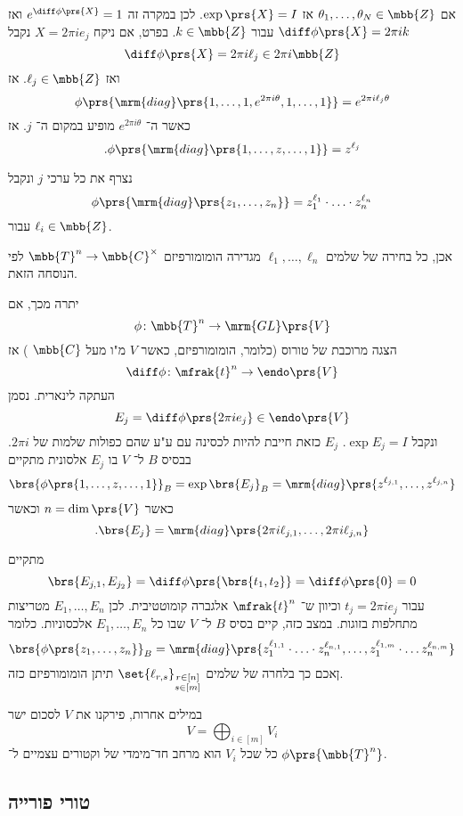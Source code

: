 \documentclass[10pt, twoside]{book}
\begin{document}
אם
$\theta_1,\ldots, \theta_N \in \mbb{Z}$
אז
$\exp\prs{X} = I$.
לכן במקרה זה
$e^{\diff \phi\prs{X}} = 1$
ואז
$\diff \phi\prs{X} = 2 \pi i k$
עבור
$k \in \mbb{Z}$.
בפרט, אם ניקח
$X = 2 \pi i e_j$
נקבל
\[\diff \phi\prs{X} = 2 \pi i \ell_j \in 2 \pi i \mbb{Z}\]
ואז
$\ell_j \in \mbb{Z}$.
אז
\[\phi\prs{\mrm{diag}\prs{1, \ldots, 1, e^{2 \pi i \theta}, 1, \ldots, 1}} = e^{2 \pi i \ell_j \theta}\]
כאשר ה־%
$e^{2 \pi i \theta}$
מופיע במקום ה־%
$j$.
אז
\[\text{.} \phi\prs{\mrm{diag}\prs{1, \ldots, z, \ldots, 1}} = z^{\ell_j}\]

נצרף את כל ערכי
$j$
ונקבל
\[\phi\prs{\mrm{diag}\prs{z_1, \ldots, z_n}} = z_1^{\ell_1} \cdot \ldots \cdot z_n^{\ell_n}\]
עבור
$\ell_i \in \mbb{Z}$.

אכן, כל בחירה של שלמים
$\ell_1, \ldots, \ell_n$
מגדירה הומומורפיזם
$\mbb{T}^n \to \mbb{C}^\times$
לפי הנוסחה הזאת.

יתרה מכך, אם
\[\phi \colon \mbb{T}^n \to \mrm{GL}\prs{V}\]
הצגה מרוכבת של טורוס (כלומר, הומומורפיזם, כאשר
$V$
מ"ו מעל
$\mbb{C}$%
)
אז
\[\diff \phi \colon \mfrak{t}^n \to \endo\prs{V}\]
העתקה לינארית. נסמן
\[E_j = \diff \phi\prs{2 \pi i e_j} \in \endo\prs{V}\]
ונקבל
$\exp E_j = I$.
$E_j$
כזאת חייבת להיות לכסינה עם ע"ע שהם כפולות שלמות של
$2 \pi i$.
בבסיס
$B$
ל־%
$V$
בו
$E_j$
אלסונית מתקיים
\[\brs{\phi\prs{1, \ldots, z, \ldots, 1}}_B = \exp\brs{E_j}_B = \mrm{diag}\prs{z^{\ell_{j,1}}, \ldots, z^{\ell_{j,n}}}\]
כאשר
$n = \dim\prs{V}$
וכאשר
\[\text{.} \brs{E_j} = \mrm{diag}\prs{2 \pi i \ell_{j,1}, \ldots, 2 \pi i \ell_{j,n}}\]

מתקיים
\[\brs{E_{j,1}, E_{j_2}} = \diff \phi\prs{\brs{t_1, t_2}} = \diff \phi\prs{0} = 0\]
עבור
$t_j = 2 \pi i e_j$
וכיוון ש־%
$\mfrak{t}^n$
אלגברה קומוטטיבית.
לכן
$E_1, \ldots, E_n$
מטריצות מתחלפות בזוגות. במצב כזה, קיים בסיס
$B$
ל־%
$V$
שבו כל
$E_1, \ldots, E_n$
אלכסוניות.
כלומר
\[\brs{\phi\prs{z_1, \ldots, z_n}}_B = \mrm{diag}\prs{z_1^{\ell_{1,1}} \cdot \ldots \cdot z_n^{\ell_{n,1}}, \ldots, z_1^{\ell_{1,m}} \cdot \ldots z_n^{\ell_{n,m}}}\]
ןאכם כך בלחרה של שלמים
$\set{\ell_{r,s}}_{\substack{r \in [n] \\ s \in [m]}}$
תיתן הומומורפיזם כזה.

במילים אחרות, פירקנו את
$V$
לסכום ישר
\[V = \bigoplus_{i \in [m]} V_i\]
כל שכל
$V_i$
הוא מרחב חד־מימדי של וקטורים עצמיים ל־%
$\phi\prs{\mbb{T}^n}$.

\subsection{טורי פורייה}
\end{document}
